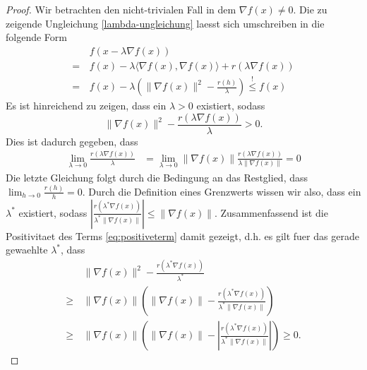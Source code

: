 \begin{proof}
Wir betrachten den nicht-trivialen Fall in dem $\nabla f(x) \neq 0$. 
Die zu zeigende Ungleichung \eqref{lambda-ungleichung} laesst sich umschreiben in die folgende Form
\begin{align*}
&f(x - \lambda \nabla f(x))\\
 = \, &f(x) - \lambda \langle \nabla f(x), \nabla f(x)\rangle + r(\lambda \nabla f(x)) \\
= \, &f(x) - \lambda( \|\nabla f(x)\|^2 - \frac{r(h)}{\lambda}) \overset{!}{\leq} f(x)
\end{align*}
Es ist hinreichend zu zeigen, dass ein $\lambda>0$ existiert, sodass
\begin{equation}
\label{eq:positiveterm}
\|\nabla f(x)\|^2 - \frac{r(\lambda \nabla f(x))}{\lambda} >0.
\end{equation}
  Dies ist dadurch gegeben, dass 
\begin{align*}
\lim_{\lambda\to 0} \frac{r(\lambda \nabla f(x))}{\lambda} &= \lim_{\lambda \to 0}\|\nabla f(x)\| \frac{r(\lambda \nabla f(x))}{\lambda \|\nabla f(x)\|}= 0
\end{align*}
Die letzte Gleichung folgt durch die Bedingung an das Restglied, dass $\lim_{h\to 0}\frac{r(h)}{h} = 0$. Durch die Definition eines Grenzwerts wissen wir also, dass ein $\lambda^*$ existiert, sodass $\left| \frac{r(\lambda^* \nabla f(x))}{\lambda^* \|\nabla f(x)\|} \right| \leq \|\nabla f(x)\|$. Zusammenfassend ist die Positivitaet des Terms \eqref{eq:positiveterm} damit gezeigt, d.h. es gilt fuer das gerade gewaehlte $\lambda^*$, dass
\begin{align*}
&\|\nabla f(x)\|^2 - \frac{r(\lambda^* \nabla f(x))}{\lambda^*} \\
\geq \, &\|\nabla f(x)\| \left( \| \nabla f(x)\| - \frac{r (\lambda^* \nabla f(x))}{\lambda^* \| \nabla f(x)\|} \right) \\
\geq \, &\| \nabla f(x)\| \left(\|\nabla f(x)\| - \left| \frac{r (\lambda^* \nabla f(x))}{\lambda^* \| \nabla f(x)\|}\right| \right) \geq 0. 
\end{align*}
\end{proof}



